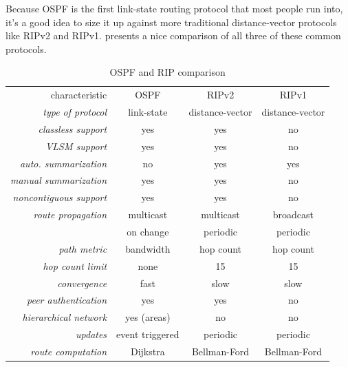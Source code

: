 Because OSPF is the first link-state routing protocol that most people run into, it's a good idea to size it up against more traditional
distance-vector protocols like RIPv2 and RIPv1.
 presents a nice comparison of all three of these common protocols.

\begin{table}
   \centering
   \begin{tabular}{rccc}
   characteristic                   & OSPF            & RIPv2           & RIPv1           \\[1ex]
   \textit{type of protocol}        & link-state      & distance-vector & distance-vector \\
   \textit{classless support}       & yes             & yes             & no              \\
   \textit{VLSM support}            & yes             & yes             & no              \\
   \textit{auto. summarization}     & no              & yes             & yes             \\
   \textit{manual summarization}    & yes             & yes             & no              \\
   \textit{noncontiguous support}   & yes             & yes             & no              \\
   \textit{route propagation}       & multicast       & multicast       & broadcast       \\
                                    & on change       & periodic        & periodic        \\
   \textit{path metric}             & bandwidth       & hop count       & hop count       \\
   \textit{hop count limit}         & none            & 15              & 15              \\
   \textit{convergence}             & fast            & slow            & slow            \\
   \textit{peer authentication}     & yes             & yes             & no              \\
   \textit{hierarchical network}    & yes (areas)     & no              & no              \\
   \textit{updates}                 & event triggered & periodic        & periodic        \\
   \textit{route computation}       & Dijkstra        & Bellman-Ford    & Bellman-Ford    \\
   \end{tabular}
   \caption{OSPF and RIP comparison}
   \label{tab:compare-ospf-rip}
\end{table}


